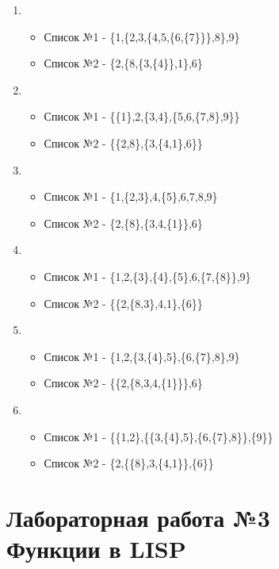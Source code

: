 \documentclass[a4paper,12pt]{article}
\begin{document}
\begin{enumerate}
	\item \begin{itemize}
		\item Список №1 - \{1,\{2,3,\{4,5,\{6,\{7\}\}\},8\},9\}
		\item Список №2 - \{2,\{8,\{3,\{4\}\},1\},6\}
	\end{itemize}

	\item \begin{itemize}
		\item Список №1 - \{\{1\},2,\{3,4\},\{5,6,\{7,8\},9\}\}
		\item Список №2 - \{\{2,8\},\{3,\{4,1\},6\}\}
	\end{itemize}

	\item \begin{itemize}
		\item Список №1 - \{1,\{2,3\},4,\{5\},6,7,8,9\}
		\item Список №2 - \{2,\{8\},\{3,4,\{1\}\},6\}
	\end{itemize}

	\item \begin{itemize}
		\item Список №1 - \{1,2,\{3\},\{4\},\{5\},6,\{7,\{8\}\},9\}
		\item Список №2 - \{\{2,\{8,3\},4,1\},\{6\}\}
	\end{itemize}

	\item \begin{itemize}
		\item Список №1 - \{1,2,\{3,\{4\},5\},\{6,\{7\},8\},9\}
		\item Список №2 - \{\{2,\{8,3,4,\{1\}\}\},6\}
	\end{itemize}

	\item \begin{itemize}
		\item Список №1 - \{\{1,2\},\{\{3,\{4\},5\},\{6,\{7\},8\}\},\{9\}\}
		\item Список №2 - \{2,\{\{8\},3,\{4,1\}\},\{6\}\}
	\end{itemize}

\end{enumerate}

\newpage
\section{Лабораторная работа №3\\Функции в LISP}
\end{document}
